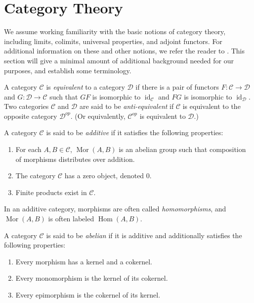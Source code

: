 \documentclass[11pt,openany]{book} %
\newcommand{\Mor}{\operatorname{Mor}}
\begin{document}
\section{Category Theory}
We assume working familiarity with the basic notions of category theory, including limits, colimits, universal properties, and adjoint functors. For additional information on these and other notions, we refer the reader to \cite{maclane}. This section will give a minimal amount of additional background needed for our purposes, and establish some terminology.\\


\begin{definition}
A category $\mathcal{C}$ is \emph{equivalent} to a category $\mathcal{D}$ if there is a pair of functors $F : \mathcal{C} \to \mathcal{D}$ and $G : \mathcal{D} \to \mathcal{C}$ such that $GF$ is isomorphic to $\operatorname{id}_{\mathcal{C}}$ and $FG$ is isomorphic to $\operatorname{id}_{\mathcal{D}}$.\\

Two categories $\mathcal{C}$ and $\mathcal{D}$ are said to be \emph{anti-equivalent} if $\mathcal{C}$ is equivalent to the opposite category $\mathcal{D}^{op}$. (Or equivalently, $\mathcal{C}^{op}$ is equivalent to $\mathcal{D}$.)
\end{definition}

\begin{definition}
\item A category $\mathcal{C}$ is said to be \emph{additive} if it satisfies the following properties:
\begin{enumerate}
	\item For each $A,B \in \mathcal{C}$, $\Mor(A,B)$ is an abelian group such that composition of morphisms distributes over addition.
    \item The category $\mathcal{C}$ has a zero object, denoted $0$.
    \item Finite products exist in $\mathcal{C}$.
\end{enumerate}

In an additive category, morphisms are often called \emph{homomorphisms}, and $\Mor(A,B)$ is often labeled $\operatorname{Hom}(A,B)$.\\

\item A category $\mathcal{C}$ is said to be \emph{abelian} if it is additive and additionally satisfies the following properties:
\begin{enumerate}
	\item Every morphism has a kernel and a cokernel.
    \item Every monomorphism is the kernel of its cokernel.
    \item Every epimorphism is the cokernel of its kernel.
\end{enumerate}
\end{definition}
\end{document}
